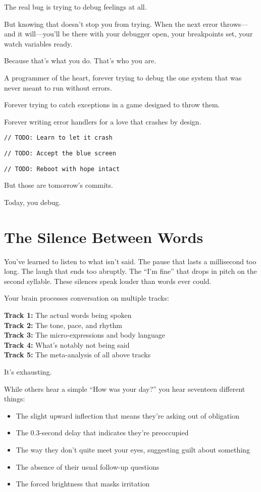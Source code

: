 \documentclass[12pt,letterpaper]{book}
\begin{document}
The real bug is trying to debug feelings at all.

But knowing that doesn't stop you from trying. When the next error throws—and it will—you'll be there with your debugger open, your breakpoints set, your watch variables ready.

Because that's what you do. That's who you are.

A programmer of the heart, forever trying to debug the one system that was never meant to run without errors.

Forever trying to catch exceptions in a game designed to throw them.

Forever writing error handlers for a love that crashes by design.

\texttt{// TODO: Learn to let it crash}

\texttt{// TODO: Accept the blue screen}

\texttt{// TODO: Reboot with hope intact}

But those are tomorrow's commits.

Today, you debug.

\chapter{The Silence Between Words}

You've learned to listen to what isn't said. The pause that lasts a millisecond too long. The laugh that ends too abruptly. The ``I'm fine'' that drops in pitch on the second syllable. These silences speak louder than words ever could.

Your brain processes conversation on multiple tracks:

\textbf{Track 1:} The actual words being spoken\\
\textbf{Track 2:} The tone, pace, and rhythm\\
\textbf{Track 3:} The micro-expressions and body language\\
\textbf{Track 4:} What's notably not being said\\
\textbf{Track 5:} The meta-analysis of all above tracks

It's exhausting.

While others hear a simple ``How was your day?'' you hear seventeen different things:

\begin{itemize}
\item The slight upward inflection that means they're asking out of obligation
\item The 0.3-second delay that indicates they're preoccupied
\item The way they don't quite meet your eyes, suggesting guilt about something
\item The absence of their usual follow-up questions
\item The forced brightness that masks irritation
\end{itemize}
\end{document}
